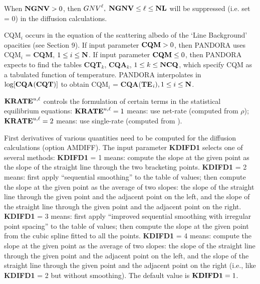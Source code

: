 \blankline
\blankline
\centerline{}
\space \noindent
When ${\bf NGNV} > 0$, then ${GNV}^\ell, \; {\bf NGNV} \leq \ell \leq {\bf NL}$ will
be suppressed (i.e. set = 0) in the diffusion calculations.
\ej
\centerline{}
\space \noindent
CQM$_i$ occurs in the equation of the scattering albedo of the `Line \break
Background' opacities (see Section 9). \np
If input parameter ${\bf CQM} > 0$, then PANDORA uses CQM$_i$ = {\bf CQM},
$1 \leq i \leq {\bf N}$. \np
If input parameter ${\bf CQM} \leq 0$, then PANDORA expects to find the tables \break
{\bf CQT}$_k$, {\bf CQA}$_k$, $1 \leq k \leq {\bf NCQ}$, which specify
CQM as a tabulated function of temperature. PANDORA interpolates in $\log[{\bf CQA}
({\bf CQT})]$ to obtain \break CQM$_i$ = {\bf CQA}({\bf TE}$_i), 1 \leq i \leq {\bf N}$.
\blankline
\blankline
\centerline{}
\space \noindent
${\bf KRATE}^{u,\ell}$ controls the formulation of certain terms in the statistical
equilibrium equations: \np
${\bf KRATE}^{u,\ell} = 1$ means: use net-rate (computed from
$\rho$); \np
${\bf KRATE}^{u,\ell} = 2$ means: use single-rate (computed from \Jbar).
\blankline
\blankline
\centerline{}
\space \noindent
First derivatives of various quantities need to be computed for the diffusion calculations
(option AMDIFF). The input parameter {\bf KDIFD1} selects one of several methods: \np
{\bf KDIFD1} = 1 means: compute the slope at the given point as the slope of the straight
line through the two bracketing points. \np
{\bf KDIFD1} = 2 means: first apply ``sequential smoothing'' to the table of values; then
compute the slope at the given point as the average of two slopes: the slope of the straight
line through the given point and the adjacent point on the left, and the slope of the
straight line through the given point and the adjacent point on the right. \np
{\bf KDIFD1} = 3 means: first apply ``improved sequential smoothing with irregular point
spacing'' to the table of values; then compute the slope at the given point from the
cubic spline fitted to all the points. \np
{\bf KDIFD1} = 4 means: compute the slope at the given point as the average of two slopes:
the slope of the straight line through the given point and the adjacent point on the left,
and the slope of the straight line through the given point and the adjacent point on the
right (i.e., like {\bf KDIFD1} = 2 but without smoothing). \np
The default value is ${\bf KDIFD1} = 1$.
